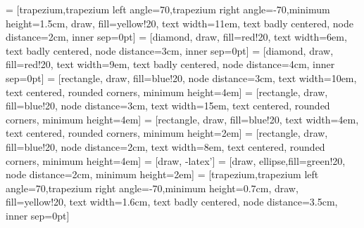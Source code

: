  = [trapezium,trapezium left angle=70,trapezium right angle=-70,minimum height=1.5cm, draw, fill=yellow!20, text width=11em, text badly centered, node distance=2cm, inner sep=0pt]
 = [diamond, draw, fill=red!20, 
    text width=6em, text badly centered, node distance=3cm, inner sep=0pt]
 = [diamond, draw, fill=red!20, 
    text width=9em, text badly centered, node distance=4cm, inner sep=0pt]
 = [rectangle, draw, fill=blue!20, node distance=3cm,
    text width=10em, text centered, rounded corners, minimum height=4em]
 = [rectangle, draw, fill=blue!20, node distance=3cm,
    text width=15em, text centered, rounded corners, minimum height=4em]
     = [rectangle, draw, fill=blue!20, 
    text width=4em, text centered, rounded corners, minimum height=2em]
     = [rectangle, draw, fill=blue!20, node distance=2cm,
    text width=8em, text centered, rounded corners, minimum height=4em]
     = [draw, -latex']
 = [draw, ellipse,fill=green!20, node distance=2cm,
    minimum height=2em]
     = [trapezium,trapezium left angle=70,trapezium right angle=-70,minimum height=0.7cm, draw, fill=yellow!20, text width=1.6cm, text badly centered, node distance=3.5cm, inner sep=0pt]
    
